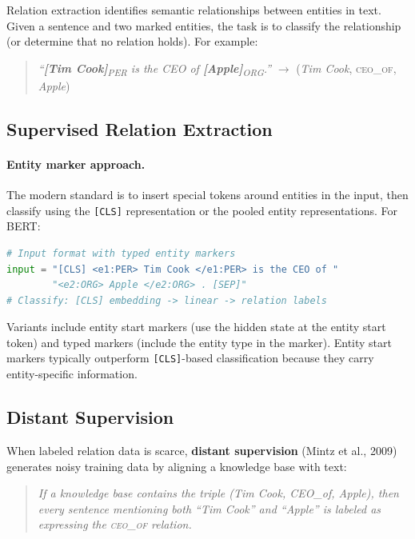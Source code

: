 Relation extraction identifies semantic relationships between entities in text.  Given a
sentence and two marked entities, the task is to classify the relationship (or determine that
no relation holds).  For example:

\begin{quote}
\emph{``\textbf{[Tim Cook]}\textsubscript{PER} is the CEO of
\textbf{[Apple]}\textsubscript{ORG}.''}
$\to$ (\textit{Tim Cook}, \textsc{ceo\_of}, \textit{Apple})
\end{quote}

\subsection{Supervised Relation Extraction}

\paragraph{Entity marker approach.}
The modern standard is to insert special tokens around entities in the input, then classify
using the \texttt{[CLS]} representation or the pooled entity representations.  For BERT:

\begin{lstlisting}[language=Python, caption={Entity marker input format for relation extraction.}]
# Input format with typed entity markers
input = "[CLS] <e1:PER> Tim Cook </e1:PER> is the CEO of "
        "<e2:ORG> Apple </e2:ORG> . [SEP]"
# Classify: [CLS] embedding -> linear -> relation labels
\end{lstlisting}

Variants include entity start markers (use the hidden state at the entity start token) and
typed markers (include the entity type in the marker).  Entity start markers typically
outperform \texttt{[CLS]}-based classification because they carry entity-specific information.

\subsection{Distant Supervision}
\label{sec:distant_supervision}

When labeled relation data is scarce, \textbf{distant supervision} (Mintz et al., 2009)
generates noisy training data by aligning a knowledge base with text:

\begin{quote}
\emph{If a knowledge base contains the triple (Tim Cook, CEO\_of, Apple), then every
sentence mentioning both ``Tim Cook'' and ``Apple'' is labeled as expressing the
\textsc{ceo\_of} relation.}
\end{quote}

